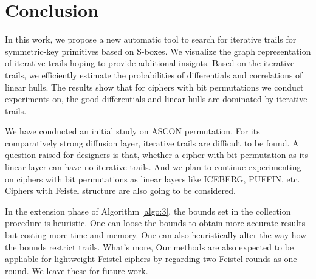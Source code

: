 \section{Conclusion\label{sec:conclusion}}

In this work, we propose a new automatic tool to search for iterative trails for symmetric-key primitives based on S-boxes. We visualize the graph representation of iterative trails hoping to provide additional insignts. Based on the iterative trails, we efficiently estimate the probabilities of differentials and correlations of linear hulls. The results show that for ciphers with bit permutations we conduct experiments on, the good differentials and linear hulls are dominated by iterative trails. 

We have conducted an initial study on ASCON permutation. For its comparatively strong diffusion layer, iterative trails are difficult to be found. A question raised for designers is that, whether a cipher with bit permutation as its linear layer can have no iterative trails. And we plan to continue experimenting on ciphers with bit permutations as linear layers like ICEBERG, PUFFIN, etc. Ciphers with Feistel structure are also going to be considered. 

In the extension phase of Algorithm \ref{algo:3}, the bounds set in the collection procedure is heuristic. One can loose the bounds to obtain more accurate results but costing more time and memory. One can also heuristically alter the way how the bounds restrict trails. What's more, Our methods are also expected to be appliable for lightweight Feistel ciphers by regarding two Feistel rounds as one round. We leave these for future work. 

